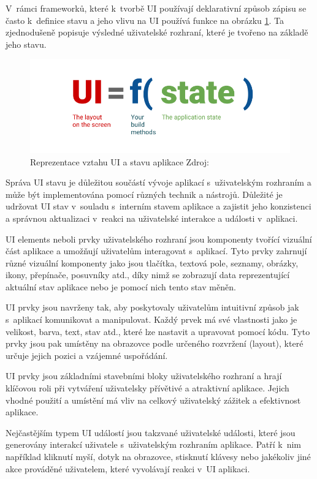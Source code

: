 V~rámci frameworků, které k~tvorbě UI používají deklarativní způsob zápisu se často k~definice stavu a jeho vlivu na UI používá funkce 
na obrázku \ref{fig:UI_function}. Ta zjednodušeně popisuje výsledné uživatelské rozhraní, které je tvořeno na základě jeho stavu.

\begin{figure}[H]
  \centering
  \includegraphics[width=.5\textwidth]{ui-equals-function-of-state.png}
  \caption{Reprezentace vztahu UI a stavu aplikace Zdroj: \cite{imgUIformula}}
  \label{fig:UI_function}
\end{figure}

Správa UI stavu je důležitou součástí vývoje aplikací s~uživatelským rozhraním a může být implementována pomocí různých technik a nástrojů.
Důležité je udržovat UI stav v~souladu s~interním stavem aplikace a zajistit jeho konzistenci a správnou aktualizaci v~reakci na uživatelské 
interakce a události v~aplikaci.

UI elements neboli prvky uživatelského rozhraní jsou komponenty tvořící vizuální část aplikace a umožňují uživatelům interagovat s~aplikací. \cite{andDocArch}
Tyto prvky zahrnují různé vizuální komponenty jako jsou tlačítka, textová pole, seznamy, obrázky, ikony, přepínače, posuvníky atd., díky nimž
se zobrazují data reprezentující aktuální stav aplikace nebo je pomocí nich tento stav měněn.

UI prvky jsou navrženy tak, aby poskytovaly uživatelům intuitivní způsob jak s~aplikací komunikovat a manipulovat. Každý prvek má své 
vlastnosti jako je velikost, barva, text, stav atd., které lze nastavit a upravovat pomocí kódu. Tyto prvky jsou pak umístěny na obrazovce 
podle určeného rozvržení (layout), které určuje jejich pozici a vzájemné uspořádání.

UI prvky jsou základními stavebními bloky uživatelského rozhraní a hrají klíčovou roli při vytváření uživatelsky přívětivé a atraktivní aplikace. 
Jejich vhodné použití a umístění má vliv na celkový uživatelský zážitek a efektivnost aplikace.

Nejčastějším typem UI událostí jsou takzvané uživatelské události, které jsou generovány interakcí uživatele s~uživatelským rozhraním aplikace. \cite{UIEvents}
Patří k~nim například kliknutí myší, dotyk na obrazovce, stisknutí klávesy nebo jakékoliv jiné akce prováděné uživatelem, které vyvolávají reakci
v~UI aplikaci.

